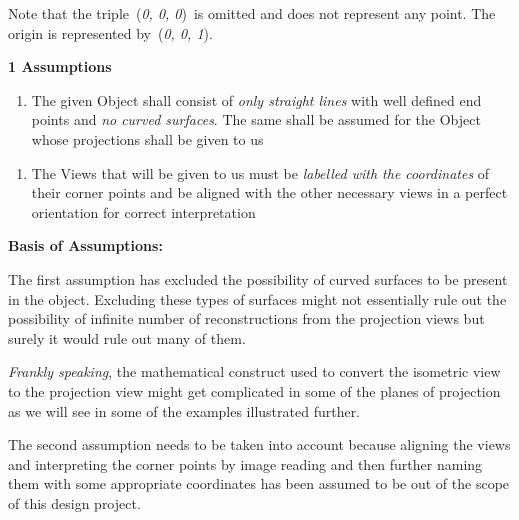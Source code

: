 \documentclass{article} %
\begin{document}
\noindent 

\noindent Note that the triple~(\textit{0, 0, 0})~is omitted and does not represent any point. The origin is represented by~(\textit{0, 0, 1}).

\noindent \textbf{}

\noindent \textbf{1    Assumptions}

\begin{enumerate}
\item \textbf{ }The given Object shall consist of \textit{only straight lines }with well defined end points and \textit{no curved surfaces}. The same shall be assumed for the Object whose projections shall be given to us
\end{enumerate}

\noindent 

\begin{enumerate}
\item  The Views that will be given to us must be \textit{labelled with the coordinates} of their corner points and be aligned with the other necessary views in a perfect orientation for correct interpretation
\end{enumerate}

\noindent 

\noindent \textbf{Basis of Assumptions:}

\noindent The first assumption has excluded the possibility of curved surfaces to be present in the object. Excluding these types of surfaces might not essentially rule out the possibility of infinite number of reconstructions from the projection views but surely it would rule out many of them. 

\textit{Frankly speaking}, the mathematical construct used to convert the isometric view to the projection view might get complicated in some of the planes of projection as we will see in some of the examples illustrated further.

\noindent The second assumption needs to be taken into account because aligning the views and interpreting the corner points by image reading and then further naming them with some appropriate coordinates has been assumed to be out of the scope of this design project.

\noindent \textbf{\underbar{}}
\end{document}

